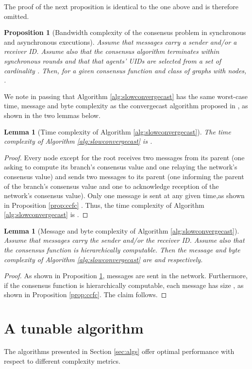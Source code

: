 \documentclass[letterpaper,10pt,conference]{ieeeconf}
\newtheorem{proposition}[theorem]{Proposition}
\newtheorem{lemma}[theorem]{Lemma}
\begin{document}
The proof of the next proposition is identical to the one above and is therefore omitted.

\begin{proposition}[Bandwidth complexity of the consensus problem in synchronous and asynchronous executions]
Assume that messages carry a sender and/or a receiver ID. Assume also that the consensus algorithm terminates within  synchronous rounds and that  that agents' UIDs are selected from a set  of cardinality .  Then, for a given consensus function  and class of graphs  with  nodes,  .
\end{proposition}

We note in passing that Algorithm \ref{alg:slowconvergecast} has the same worst-case time, message and byte complexity as the convergecast algorithm proposed in \cite{FR-MP:13}, as shown in the two lemmas below.
\begin{lemma}[Time complexity of Algorithm \ref{alg:slowconvergecast}]
\label{prop:cctc}
The time complexity of Algorithm \ref{alg:slowconvergecast} is .
\end{lemma}
\begin{proof}
Every node except for the root receives two messages from its parent (one asking to compute its branch's consensus value and one relaying the network's consensus value) and sends two messages to its parent (one informing the parent of the branch's consensus value and one to acknowledge reception of the network's consensus value). Only one message is sent at any given time,as shown in Proposition \ref{prop:ccfc} . Thus, the time complexity of Algorithm \ref{alg:slowconvergecast} is . 
\end{proof}
\begin{lemma}[Message and byte complexity of Algorithm \ref{alg:slowconvergecast}]
Assume that messages carry the sender and/or the receiver ID. Assume also that the consensus function is hierarchically computable. Then the message and byte complexity of Algorithm \ref{alg:slowconvergecast} are  and  respectively. 
\end{lemma}
\begin{proof}
As shown in Proposition \ref{prop:cctc},  messages are sent in the network. Furthermore, if the consensus function is hierarchically computable, each message has size , as shown in Proposition \ref{prop:ccfc}. The claim follows.
\end{proof}

\section{A tunable algorithm}
\label{sec:tunable}
The algorithms presented in Section \ref{sec:algs} offer optimal performance with respect to different complexity metrics.\
\end{document}
